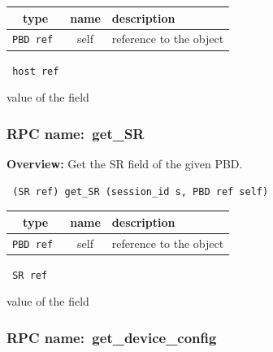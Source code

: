 
 
\vspace{0.3cm}
\begin{tabular}{|c|c|p{7cm}|}
 \hline
{\bf type} & {\bf name} & {\bf description} \\ \hline
{\tt PBD ref } & self & reference to the object \\ \hline 

\end{tabular}

\vspace{0.3cm}

{\tt 
host ref
}


value of the field
\vspace{0.3cm}
\vspace{0.3cm}
\vspace{0.3cm}
\subsubsection{RPC name:~get\_SR}

{\bf Overview:} 
Get the SR field of the given PBD.

\begin{verbatim} (SR ref) get_SR (session_id s, PBD ref self)\end{verbatim}



 
\vspace{0.3cm}
\begin{tabular}{|c|c|p{7cm}|}
 \hline
{\bf type} & {\bf name} & {\bf description} \\ \hline
{\tt PBD ref } & self & reference to the object \\ \hline 

\end{tabular}

\vspace{0.3cm}

{\tt 
SR ref
}


value of the field
\vspace{0.3cm}
\vspace{0.3cm}
\vspace{0.3cm}
\subsubsection{RPC name:~get\_device\_config}

